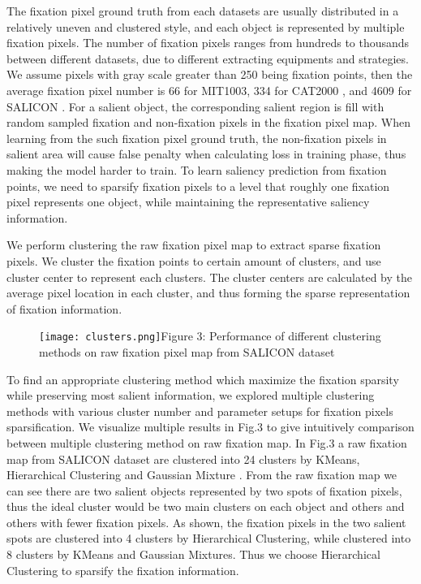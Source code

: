 \documentclass[letterpaper, 10 pt, conference]{ieeeconf}  %
\begin{document}
\par The fixation pixel ground truth from each datasets are usually distributed in a relatively uneven and clustered style, and each object is represented by multiple fixation pixels. The number of fixation pixels ranges from hundreds to thousands between different datasets, due to different extracting equipments and strategies. We assume pixels with gray scale greater than 250 being fixation points, then the average fixation pixel number is 66 for MIT1003\cite{b23}, 334 for CAT2000 \cite{b24}, and 4609 for SALICON \cite{b25}. For a salient object, the corresponding salient region is fill with random sampled fixation and non-fixation pixels in the fixation pixel map. When learning from the such fixation pixel ground truth, the non-fixation pixels in salient area will cause false penalty when calculating loss in training phase, thus making the model harder to train. To learn saliency prediction from fixation points, we need to sparsify fixation pixels to a level that roughly one fixation pixel represents one object, while maintaining the representative saliency information.

\par We perform clustering the raw fixation pixel map to extract sparse fixation pixels. We cluster the fixation points to certain amount of clusters, and use cluster center to represent each clusters. The cluster centers are calculated by the average pixel location in each cluster, and thus forming the sparse representation of fixation information.

\begin{figure}
\centering
    \texttt{[image: clusters.png]}{Figure 3: Performance of different clustering methods on raw fixation pixel map from SALICON dataset\label{fig3}}
\end{figure}

\par To find an appropriate clustering method which maximize the fixation sparsity while preserving most salient information, we explored multiple clustering methods with various cluster number and parameter setups for fixation pixels sparsification. We visualize multiple results in Fig.3 to give intuitively comparison between multiple clustering method on raw fixation map. In Fig.3 a raw fixation map from SALICON dataset are clustered into 24 clusters by KMeans, Hierarchical Clustering \cite{b26} and Gaussian Mixture \cite{b27}. From the raw fixation map we can see there are two salient objects represented by two spots of fixation pixels, thus the ideal cluster would be two main clusters on each object and others and others with fewer fixation pixels. As shown, the fixation pixels in the two salient spots are clustered into 4 clusters by Hierarchical Clustering, while clustered into 8 clusters by KMeans and Gaussian Mixtures. Thus we choose Hierarchical Clustering to sparsify the fixation information.
\end{document}
